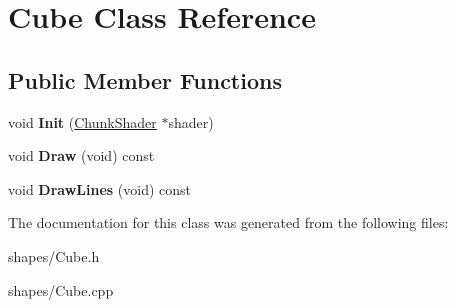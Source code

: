 \hypertarget{classCube}{\section{\-Cube \-Class \-Reference}
\label{classCube}
}
\subsection*{\-Public \-Member \-Functions}
\begin{DoxyCompactItemize}
\item 
\hypertarget{classCube_ab8eeecb48f43ca2e67ac62c4f5da4f1a}{void {\bfseries \-Init} (\hyperlink{classChunkShader}{\-Chunk\-Shader} $\ast$shader)}\label{classCube_ab8eeecb48f43ca2e67ac62c4f5da4f1a}

\item 
\hypertarget{classCube_a4951e9c17d20b7d47a45ea14cb839f9f}{void {\bfseries \-Draw} (void) const }\label{classCube_a4951e9c17d20b7d47a45ea14cb839f9f}

\item 
\hypertarget{classCube_a9e96713d2fec806f61a37c6d6c1628c1}{void {\bfseries \-Draw\-Lines} (void) const }\label{classCube_a9e96713d2fec806f61a37c6d6c1628c1}

\end{DoxyCompactItemize}


\-The documentation for this class was generated from the following files\-:\begin{DoxyCompactItemize}
\item 
shapes/\-Cube.\-h\item 
shapes/\-Cube.\-cpp\end{DoxyCompactItemize}
